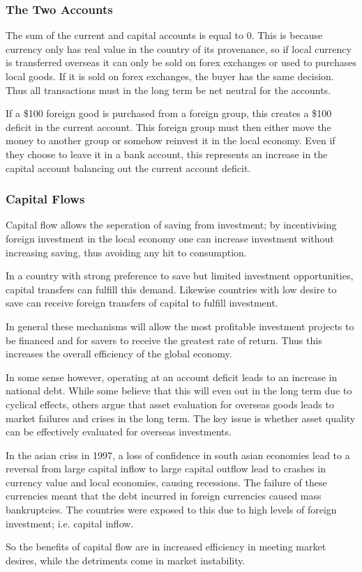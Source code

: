 \documentclass[12pt]{report}
\begin{document}
\begin{flushleft}
\subsubsection*{The Two Accounts}

The sum of the current and capital accounts is equal to \(0\). This is because
currency only has real value in the country of its provenance, so if local
currency is transferred overseas it can only be sold on forex exchanges or used
to purchases local goods. If it is sold on forex exchanges, the buyer has the
same decision. Thus all transactions must in the long term be net neutral for
the accounts. \par
If a \$100 foreign good is purchased from a foreign group, this creates a \$100
deficit in the current account. This foreign group must then either move the
money to another group or somehow reinvest it in the local economy. Even if
they choose to leave it in a bank account, this represents an increase in the
capital account balancing out the current account deficit.

\subsubsection*{Capital Flows}

Capital flow allows the seperation of saving from investment; by incentivising
foreign investment in the local economy one can increase investment without
increasing saving, thus avoiding any hit to consumption. \par
In a country with strong preference to save but limited investment
opportunities, capital transfers can fulfill this demand. Likewise countries
with low desire to save can receive foreign transfers of capital to fulfill
investment. \par
In general these mechanisms will allow the most profitable investment projects
to be financed and for savers to receive the greatest rate of return. Thus this
increases the overall efficiency of the global economy. \par
In some sense however, operating at an account deficit leads to an increase in
national debt. While some believe that this will even out in the long term
due to cyclical effects, others argue that asset evaluation for overseas goods
leads to market failures and crises in the long term. The key issue is whether
asset quality can be effectively evaluated for overseas investments. \par
In the asian criss in 1997, a loss of confidence in south asian economies lead
to a reversal from large capital inflow to large capital outflow lead to
crashes in currency value and local economies, causing recessions. The failure
of these currencies meant that the debt incurred in foreign currencies caused
mass bankruptcies. The countries were exposed to this due to high levels of
foreign investment; i.e. capital inflow. \par
So the benefits of capital flow are in increased efficiency in meeting market
desires, while the detriments come in market instability.


\end{flushleft}
\end{document}
